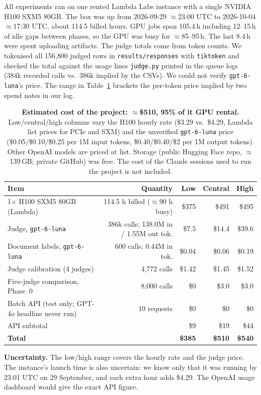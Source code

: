 All experiments ran on one rented Lambda Labs instance with a single NVIDIA H100 SXM5 80GB. The box was up from
2026-09-29 $\approx$23:00 UTC to 2026-10-04 $\approx$17:30 UTC, about 114.5 billed hours. GPU jobs span 105.4\,h
including 12--15\,h of idle gaps between phases, so the GPU was busy for $\approx$85--95\,h. The last 8.4\,h were spent
uploading artifacts. The judge totals come from token counts. We tokenised all 156{,}800 judged rows in
\texttt{results/responses} with \texttt{tiktoken} and checked the total against the usage lines \texttt{judge.py}
printed in the queue logs (384k recorded calls vs.\ 386k implied by the CSVs). We could not verify
\texttt{gpt-6-luna}'s price. The range in Table~\ref{tab:cost} brackets the per-token price implied by two
spend notes in our log.

\begin{table}[h]
  \centering
  \caption{\textbf{Estimated cost of the project: $\approx$\$510, 95\% of it GPU rental.} Low/central/high columns
  vary the H100 hourly rate (\$3.29 vs.\ \$4.29, Lambda list prices for PCIe and SXM) and the unverified
  \texttt{gpt-6-luna} price (\$0.05/\$0.10/\$0.25 per 1M input tokens, \$0.40/\$0.40/\$2 per 1M output tokens). Other
  OpenAI models are priced at list. Storage (public Hugging Face repo, $\approx$139\,GB; private GitHub) was free. The cost
  of the Claude sessions used to run the project is not included.}
  \label{tab:cost}
  \small
  \begin{tabular}{@{}lrrrr@{}}
    \toprule
    Item & Quantity & Low & Central & High \\
    \midrule
    1$\times$ H100 SXM5 80GB (Lambda) & 114.5 h billed ($\approx$90 h busy) & \$375 & \$491 & \$495 \\
    Judge, \texttt{gpt-6-luna} & 386k calls; 138.0M in / 1.55M out tok. & \$7.5 & \$14.4 & \$39.6 \\
    Document labels, \texttt{gpt-6-luna} & 600 calls; 0.44M in tok. & \$0.04 & \$0.06 & \$0.19 \\
    Judge calibration (4 judges) & 4{,}772 calls & \$1.42 & \$1.45 & \$1.52 \\
    Five-judge comparison, Phase~0 & 8{,}000 calls & \$0 & \$3.0 & \$3.0 \\
    Batch API (test only; GPT-4o headline never run) & 10 requests & \$0 & \$0 & \$0 \\
    \midrule
    API subtotal & & \$9 & \$19 & \$44 \\
    \textbf{Total} & & \textbf{\$385} & \textbf{\$510} & \textbf{\$540} \\
    \bottomrule
  \end{tabular}
\end{table}

\textbf{Uncertainty.} The low/high range covers the hourly rate and the judge price. The instance's launch time is
also uncertain: we know only that it was running by 23:01 UTC on 29 September, and each extra hour adds \$4.29. The OpenAI usage
dashboard would give the exact API figure.
